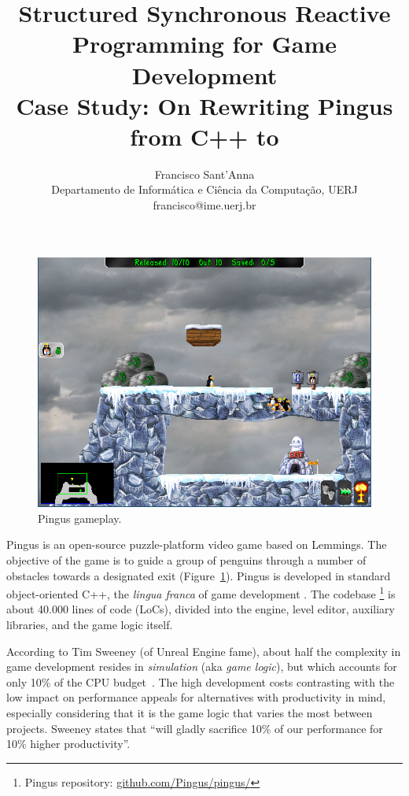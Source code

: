 \documentclass{vgtc}                          %
\title{Structured Synchronous Reactive Programming for Game Development
        \\ \Large{Case Study: On Rewriting Pingus from C++ to \CEU}}
\author{Francisco Sant'Anna
        \\ Departamento de Inform\'atica e Ci\^encia da Computa\c{c}\~ao, UERJ
        \\ francisco@ime.uerj.br}
\begin{document}

\maketitle

\begin{figure}[t]
\centering
\includegraphics[width=\columnwidth]{pingus}
\caption{Pingus gameplay.
\label{fig.pingus}
}
\end{figure}

Pingus is an open-source puzzle-platform video game based on Lemmings.
The objective of the game is to guide a group of penguins through a number of
obstacles towards a designated exit (Figure~\ref{fig.pingus}).
%
Pingus is developed in standard object-oriented C++, the \emph{lingua franca}
of game development \cite{games.patterns}.
The codebase%
\footnote{Pingus repository: \url{github.com/Pingus/pingus/}}
is about 40.000 lines of code (LoCs), divided into
the engine, level editor, auxiliary libraries, and the game logic itself.

According to Tim Sweeney (of Unreal Engine fame), about half the complexity in
game development resides in \emph{simulation} (aka \emph{game logic}), but
which accounts for only 10\% of the CPU budget~\cite{games.sweeney}.
The high development costs contrasting with the low impact on performance
appeals for alternatives with productivity in mind, especially considering that
it is the game logic that varies the most between projects.
Sweeney states that ``will gladly sacrifice 10\% of our performance for 10\%
higher productivity''.
\end{document}
